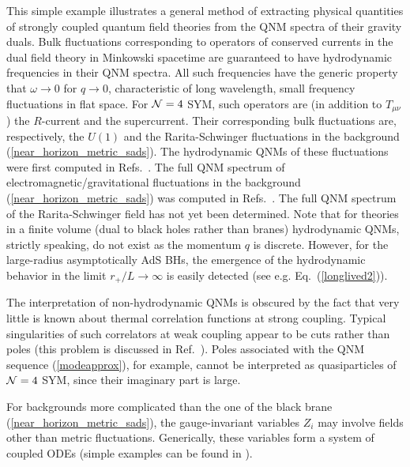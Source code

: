 \documentclass[]{iopart}
\begin{document}
This simple example illustrates a general method of extracting physical
quantities of strongly coupled quantum field theories from the QNM spectra of
their gravity duals.  Bulk fluctuations corresponding to operators of
conserved currents in the dual field theory in Minkowski spacetime are
guaranteed to have hydrodynamic frequencies in their QNM spectra. All such
frequencies have the generic property that $\omega \rightarrow 0$ for
$q\rightarrow 0$, characteristic of long wavelength, small frequency
fluctuations in flat space.
%
For ${\cal N}=4$ SYM, such operators are (in addition to $T_{\mu\nu}$) the
$R$-current and the supercurrent. Their corresponding bulk fluctuations are,
respectively, the $U(1)$ and the Rarita-Schwinger fluctuations in the
background (\ref{near_horizon_metric_sads}).
%
The hydrodynamic QNMs of these fluctuations were first computed in
Refs.~\cite{Policastro:2002se, Nunez:2003eq, Policastro:2008cx}.  The full QNM
spectrum of electromagnetic/gravitational fluctuations in the background
(\ref{near_horizon_metric_sads}) was computed in Refs.~\cite{Nunez:2003eq,
  Kovtun:2005ev}. The full QNM spectrum of the Rarita-Schwinger field has not
yet been determined.
%
Note that for theories in a finite volume (dual to black holes rather than
branes) hydrodynamic QNMs, strictly speaking, do not exist as the momentum $q$
is discrete.  However, for the large-radius asymptotically AdS BHs, the
emergence of the hydrodynamic behavior in the limit $r_+/L \rightarrow \infty$
is easily detected (see e.g.  Eq.~(\ref{longlived2})).
%

The interpretation of non-hydrodynamic QNMs is obscured by the fact that very
little is known about thermal correlation functions at strong coupling.
Typical singularities of such correlators at weak coupling appear to be cuts
rather than poles (this problem is discussed in Ref.~\cite{Hartnoll:2005ju}).
Poles associated with the QNM sequence (\ref{modeapprox}), for example, cannot
be interpreted as quasiparticles of ${\cal N}=4$ SYM, since their imaginary
part is large.

For backgrounds more complicated than the one of the black brane
(\ref{near_horizon_metric_sads}), the gauge-invariant variables $Z_i$ may
involve fields other than metric fluctuations.  Generically, these variables
form a system of coupled ODEs (simple examples can be found in
\cite{Parnachev:2005hh, Benincasa:2005iv, Son:2006em}).
\end{document}
